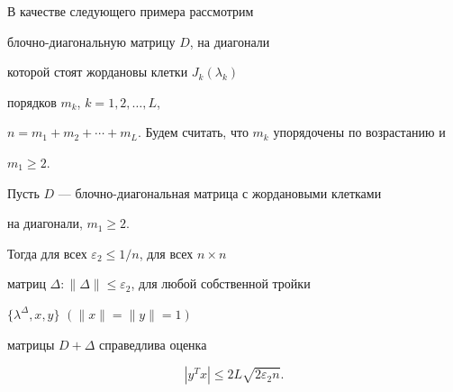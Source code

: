 В качестве следующего примера рассмотрим 


блочно-диагональную матрицу $D$, на диагонали


которой стоят жордановы клетки $J_{k}(\lambda_k)$


порядков $m_k$, $k=1,2,\dotsc, L$,\;


$n=m_1+m_2+\dotsb+m_L$. Будем считать, что $m_k$ упорядочены по возрастанию и


$m_1\ge 2$.





\begin{lem}


Пусть $D$ --- блочно-диагональная матрица с жордановыми клетками


на диагонали, $m_1\ge 2$.


Тогда для всех $\varepsilon_2\le 1/n$, для всех $n\times n$


матриц $\Delta: \|\Delta\|\le \varepsilon_2$, для любой собственной тройки


$\{\lambda^{\Delta},x,y\}$ $(\|x\|=\|y\|=1)$


матрицы $D+\Delta$ справедлива оценка


$$


|y^T x|\le 2L\sqrt{2\varepsilon_2 n}.


$$


\end{lem}





